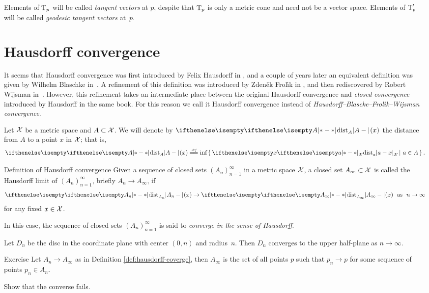Elements of $\text{\rm T}_p$ will be called 
\emph{tangent vectors} 
at $p$,
despite that $\text{\rm T}_p$ is only a metric cone and need not be a vector space.
Elements of $\text{\rm T}'_p$ will be called 
\emph{geodesic tangent vectors} 
at~$p$.

\section{Hausdorff convergence}

It seems that Hausdorff convergence was first introduced by Felix Hausdorff in \cite{hausdorff},
and a couple of years later an equivalent definition was given by Wilhelm Blaschke in~\cite{blaschke}.
A refinement of this definition was introduced by  Zden\v{e}k Frol\'{\i}k in \cite{frolik},
and then rediscovered by Robert Wijsman in~\cite{wijsman}.  
However, this refinement takes an intermediate place between the original Hausdorff convergence and {}\emph{closed convergence} introduced by Hausdorff in the same book. 
For this reason we call it Hausdorff convergence
instead of
{}\emph{Hausdorff--Blascke--Frol\'{\i}k--Wijsman convergence}.


Let $\mathcal{X}$ be a metric space and $A\subset \spc{X}$.
We will denote by $\dist{A}{}{}(x)$ the distance from $A$ to a point $x$ in $\mathcal{X}$;
that is,
$$\dist{A}{}{}(x)\df\inf\set{\dist{a}{x}{\spc{X}}}{a\in A}.$$

\begin{thm}{Definition of Hausdorff convergence}\label{def:hausdorff-coverge}
Given a sequence of closed sets $(A_n)_{n=1}^\infty$ in a metric space $\mathcal{X}$, 
a closed set $A_\infty\subset \spc{X}$ is called the Hausdorff limit of $(A_n)_{n=1}^\infty$,
briefly $A_n\to A_\infty$, if 
$$\dist{A_n}{}{}(x)\to\dist{A_\infty}{}{}(x)\ \ \t{as}\ \ n\to\infty$$
for any fixed $x\in \spc{X}$.

In this case, the sequence of closed sets $(A_n)_{n=1}^\infty$ is said to \emph{converge in the sense of Hausdorff}.
\end{thm}

Let $D_n$ be the disc in the coordinate plane 
with center $(0,n)$ and radius~$n$.
Then $D_n$ converges to the upper half-plane as $n\to\infty$. 

\begin{thm}{Exercise}\label{ex:hausdorff-conv}
Let $A_n\to A_\infty$ as in Definition \ref{def:hausdorff-coverge}, then $A_\infty$ is the set of all points $p$ such that   $p_n\to p$ for some sequence of points  $p_n\in A_n$.

Show that the converse fails.
\end{thm}

